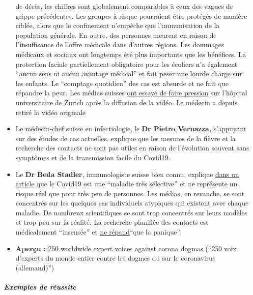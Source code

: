 \begin{itemize}
  de décès, les chiffres sont globalement comparables à ceux des vagues
  de grippe précédentes. Les groupes à risque pourraient être protégés
  de manière ciblée, alors que le confinement n'empêche que
  l'immunisation de la population générale. En outre, des personnes
  meurent en raison de l'insuffisance de l'offre médicale dans d'autres
  régions. Les dommages médicaux et sociaux ont longtemps été plus
  importants que les bénéfices. La protection faciale partiellement
  obligatoire pour les écoliers n'a également ``aucun sens ni aucun
  avantage médical'' et fait peser une lourde charge sur les enfants. Le
  ``comptage quotidien'' des cas est absurde et ne fait que répandre la
  peur. Les médias suisses
  \href{https://www.blick.ch/news/schweiz/unispital-distanziert-sich-von-umstrittenen-aussagen-corona-kritiker-feiern-videobotschaft-von-zuercher-oberarzt-id15903859.html}{ont
  essayé de faire pression} sur l'hôpital universitaire de Zurich après
  la diffusion de la vidéo. Le médecin a depuis retiré la vidéo
  originale
\item
  Le médecin-chef suisse en infectiologie, le \textbf{Dr Pietro
  Vernazza,} s'appuyant sur des études de cas actuelles, explique que
  les mesures de la fièvre et la recherche des contacts ne sont pas
  utiles en raison de l'évolution souvent sans symptômes et de la
  transmission facile du Covid19.
\item
  Le \textbf{Dr Beda Stadler}, immunologiste suisse bien connu, explique
  \href{https://www.swissinfo.ch/ita/seconda-ondata-con-lockdown--in-svizzera-no-di-sicuro/45797198}{dans
  un article} que le Covid19 est une ``maladie très sélective'' et ne
  représente un risque réel que pour très peu de personnes. Les médias,
  en revanche, se sont concentrés sur les quelques cas individuels
  atypiques qui existent avec chaque maladie. De nombreux scientifiques
  se sont trop concentrés sur leurs modèles et trop peu sur la réalité.
  La recherche planifiée des contacts est médicalement ``insensée'' et
  \href{https://www.blick.ch/news/schweiz/behoerden-und-experten-raetseln-wo-ist-das-virus-hin-id15915001.html}{ne
  répand}``que la panique''.
\item
  \textbf{Aperçu :}
  \href{https://www.rubikon.news/artikel/weltweiter-widerstand}{250
  worldwide expert voices against corona dogmas} (``250 voix d'experts
  du monde entier contre les dogmes du sur le coronavirus (allemand)'')
\end{itemize}

\hypertarget{exemples-de-ruxe9ussite}{%
\subparagraph{\texorpdfstring{\textbf{Exemples de
réussite}}{Exemples de réussite}}\label{exemples-de-ruxe9ussite}}

